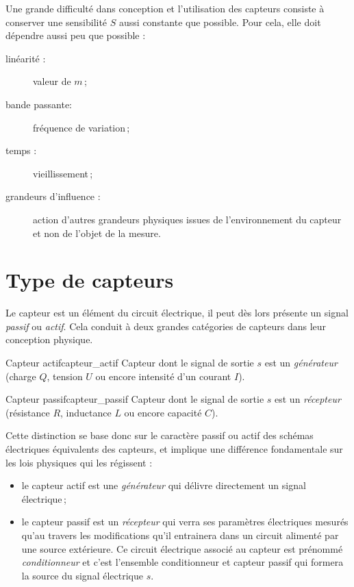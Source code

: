 Une grande difficulté dans conception et l'utilisation des capteurs consiste à conserver une sensibilité $S$ aussi constante que possible. Pour cela, elle doit dépendre aussi peu que possible :
\begin{description}
\item[linéarité :] valeur de $m$\,;
\item[bande passante:] fréquence de variation\,;
\item[temps :] vieillissement\,;
\item[grandeurs d'influence :] action d'autres grandeurs physiques issues de l'environnement du capteur et non de l'objet de la mesure.
\end{description}

\section{Type de capteurs}

Le capteur est un élément du circuit électrique, il peut dès lors présente un signal \emph{passif} ou \emph{actif}. Cela conduit à deux grandes catégories de capteurs dans leur conception physique.
\begin{definition}{Capteur actif}{capteur_actif}
Capteur dont le signal de sortie $s$ est un \emph{générateur} (charge $Q$, tension $U$ ou encore intensité d'un courant $I$).
\end{definition}
\begin{definition}{Capteur passif}{capteur_passif}
Capteur dont le signal de sortie $s$ est un \emph{récepteur} (résistance $R$, inductance $L$ ou encore capacité $C$).
\end{definition}

Cette distinction se base donc sur le caractère passif ou actif des schémas électriques équivalents des capteurs, et implique une différence fondamentale sur les lois physiques qui les régissent :
\begin{itemize}
\item le capteur actif est une \emph{générateur} qui délivre directement un signal électrique\,;
\item le capteur passif est un \emph{récepteur} qui verra ses paramètres électriques mesurés qu'au travers les modifications qu'il entrainera dans un circuit alimenté par une source extérieure. Ce circuit électrique associé au capteur est prénommé \emph{conditionneur} et c'est l'ensemble conditionneur et capteur passif qui formera la source du signal électrique $s$.
\end{itemize}

